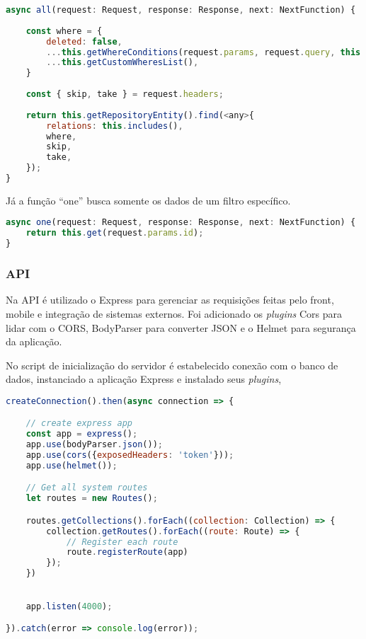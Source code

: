 \begin{lstlisting}[language=JavaScript, caption={TypeOrm: Obter lista de resgistro}]
async all(request: Request, response: Response, next: NextFunction) {
	
	const where = {
		deleted: false,
		...this.getWhereConditions(request.params, request.query, this.getRepositoryEntity().create()),
		...this.getCustomWheresList(),
	}
	
	const { skip, take } = request.headers;
	
	return this.getRepositoryEntity().find(<any>{
		relations: this.includes(),
		where,
		skip,
		take,
	});
}
\end{lstlisting}

Já a função ``one'' busca somente os dados de um filtro específico.

\begin{lstlisting}[language=JavaScript, caption={TypeOrm: Obter um registro}]
async one(request: Request, response: Response, next: NextFunction) {
	return this.get(request.params.id);
}
\end{lstlisting}

\subsubsection{API}
Na API é utilizado o Express para gerenciar as requisições feitas pelo front, mobile e integração de sistemas externos.
Foi adicionado os \textit{plugins} Cors para lidar com o CORS, BodyParser para converter JSON e o Helmet para segurança da aplicação.

No script de inicialização do servidor é estabelecido conexão com o banco de dados, instanciado a aplicação Express e instalado seus \textit{plugins}, 

\begin{lstlisting}[language=JavaScript, caption={Script de inicialização do servidor}]
createConnection().then(async connection => {

	// create express app
	const app = express();
	app.use(bodyParser.json());
	app.use(cors({exposedHeaders: 'token'}));
	app.use(helmet());

	// Get all system routes
	let routes = new Routes();

	routes.getCollections().forEach((collection: Collection) => {
		collection.getRoutes().forEach((route: Route) => {
			// Register each route
			route.registerRoute(app)
		});
	})

	
	app.listen(4000);

}).catch(error => console.log(error));
\end{lstlisting}

